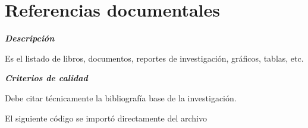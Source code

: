 \section{Referencias documentales}

\textbf{\textit{Descripción}}

Es el listado de libros, documentos, reportes de investigación, gráficos, tablas, etc.

\textbf{\textit{Criterios de calidad}}

Debe citar técnicamente la bibliografía base de la investigación.

El siguiente código se importó directamente del archivo %

